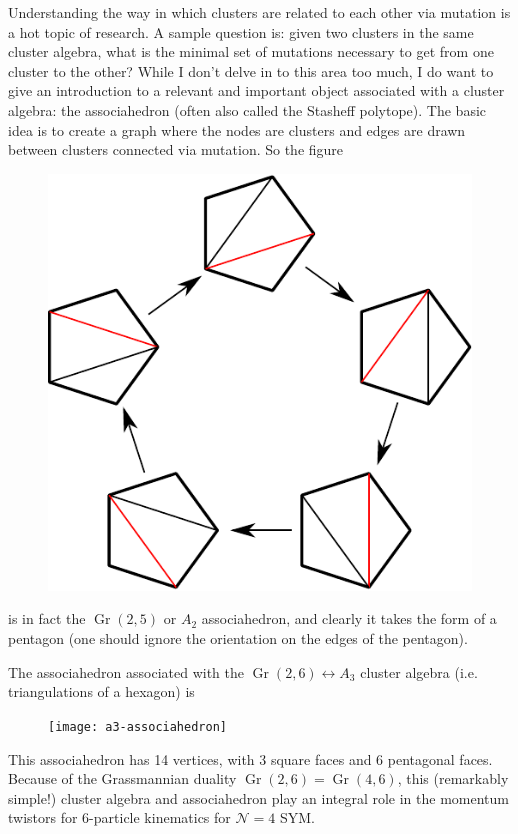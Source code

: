 \documentclass[11pt]{article}
\DeclareMathOperator{\Gr}{Gr}
\begin{document}
Understanding the way in which clusters are related to each other via mutation is a hot topic of research. A sample question is: given two clusters in the same cluster algebra, what is the minimal set of mutations necessary to get from one cluster to the other? While I don't delve in to this area too much, I do want to give an introduction to a relevant and important object associated with a cluster algebra: the associahedron (often also called the Stasheff polytope). The basic idea is to create a graph where the nodes are clusters and edges are drawn between clusters connected via mutation. So the figure
\begin{figure}[h]
  \centering
  \includegraphics[scale=0.6]{pentagon-triangulations}
\end{figure}

\noindent is in fact the $\Gr(2,5)$ or $A_2$ associahedron, and clearly it takes the form of a pentagon (one should ignore the orientation on the edges of the pentagon).

The associahedron associated with the $\Gr(2,6) \leftrightarrow A_3$ cluster algebra (i.e. triangulations of a hexagon) is
\begin{figure}[h]
  \centering
  \texttt{[image: a3-associahedron]}
\end{figure}

\noindent This associahedron has 14 vertices, with 3 square faces and 6 pentagonal faces. Because of the Grassmannian duality $\Gr(2,6) = \Gr(4,6)$, this (remarkably simple!) cluster algebra and associahedron play an integral role in the momentum twistors for 6-particle kinematics for $\mathcal{N}=4$ SYM. 
\end{document}
